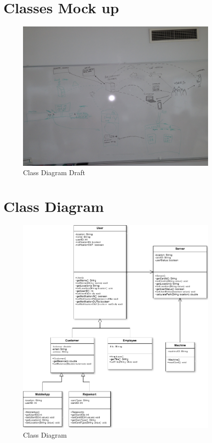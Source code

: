 \renewcommand{\headrulewidth}{0.1pt}
\renewcommand{\footrulewidth}{0.1pt}

\section*{Classes Mock up}

\begin{figure}[ht!]
\centering
\includegraphics[width=100mm]{graphics/Rich_picture_image.jpeg}
\caption{Class Diagram Draft}
\label{overflow}
\end{figure}

\section*{Class Diagram}

\begin{figure}[ht!]
\centering
\includegraphics[width=100mm]{graphics/class_diagram.png}
\caption{Class Diagram}
\label{overflow}
\end{figure}

